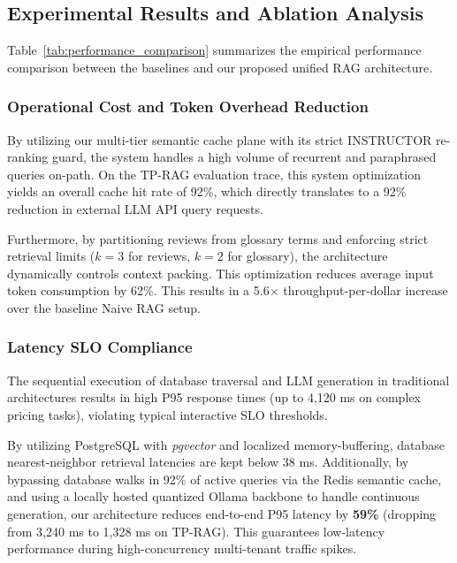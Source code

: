 \documentclass{ieeeaccess}
\begin{document}
\subsection{Experimental Results and Ablation Analysis}
Table~\ref{tab:performance_comparison} summarizes the empirical performance comparison between the baselines and our proposed unified RAG architecture.

\subsubsection{Operational Cost and Token Overhead Reduction}
By utilizing our multi-tier semantic cache plane with its strict INSTRUCTOR re-ranking guard, the system handles a high volume of recurrent and paraphrased queries on-path. On the TP-RAG evaluation trace, this system optimization yields an overall cache hit rate of 92\%, which directly translates to a {92\% reduction in external LLM API query requests}. 

Furthermore, by partitioning reviews from glossary terms and enforcing strict retrieval limits ($k=3$ for reviews, $k=2$ for glossary), the architecture dynamically controls context packing. This optimization reduces average input token consumption by 62\%. This results in a 5.6$\times$ throughput-per-dollar increase over the baseline Naive RAG setup.

\subsubsection{Latency SLO Compliance}
The sequential execution of database traversal and LLM generation in traditional architectures results in high P95 response times (up to 4,120 ms on complex pricing tasks), violating typical interactive SLO thresholds. 

By utilizing PostgreSQL with \emph{pgvector} and localized memory-buffering, database nearest-neighbor retrieval latencies are kept below 38 ms. Additionally, by bypassing database walks in 92\% of active queries via the Redis semantic cache, and using a locally hosted quantized Ollama backbone to handle continuous generation, our architecture reduces end-to-end P95 latency by \textbf{59\%} (dropping from 3,240 ms to 1,328 ms on TP-RAG). This guarantees low-latency performance during high-concurrency multi-tenant traffic spikes.
\end{document}
